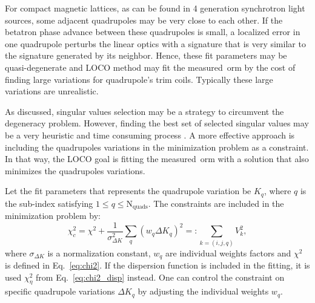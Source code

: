 For compact magnetic lattices, as can be found in 4 generation synchrotron light sources, some adjacent quadrupoles may be very close to each other. If the betatron phase advance between these quadrupoles is small, a localized error in one quadrupole perturbs the linear optics with a signature that is very similar to the signature generated by its neighbor. Hence, these fit parameters may be quasi-degenerate and LOCO method may fit the measured~\gls{orm} by the cost of finding large variations for quadrupole's trim coils. Typically these large variations are unrealistic.

As discussed, singular values selection may be a strategy to circumvent the degeneracy problem. However, finding the best set of selected singular values may be a very heuristic and time consuming process \cite{icfa_laurent}. A more effective approach is including the quadrupoles variations in the minimization problem as a constraint. In that way, the LOCO goal is fitting the measured~\gls{orm} with a solution that also minimizes the quadrupoles variations. 

Let the fit parameters that represents the quadrupole variation be $K_{q}$, where $q$ is the sub-index satisfying $1 \leq q \leq \mathrm{N}_{\mathrm{quads}}$. The constraints are included in the minimization problem by:
\begin{equation}
    \chi^2_{c} = \chi^2 + \dfrac{1}{\sigma_{\Delta K}^2}\sum_q \left(w_q \Delta K_q\right)^2 =: \sum_{{k = (i,j, q)}} V_{k}^2,
    \label{eq:chi2_constraint}
\end{equation}
where $\sigma_{\Delta K}$ is a normalization constant, $w_q$ are individual weights factors and $\chi^2$ is defined in Eq.~\eqref{eq:chi2}. If the dispersion function is included in the fitting, it is used $\chi^2_{\eta}$ from Eq.~\eqref{eq:chi2_disp} instead. One can control the constraint on specific quadrupole variations $\Delta K_q$ by adjusting the individual weights $w_q$.

